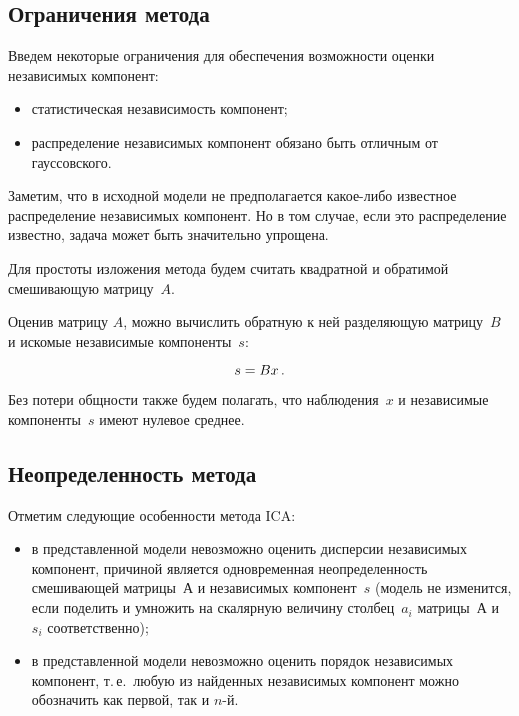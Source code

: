 \begin{multicols}{2}
\subsection{Ограничения метода}

Введем некоторые ограничения для обеспечения возможности оценки
независимых компонент:
\begin{itemize}
\item  статистическая независимость компонент;

\item распределение независимых компонент обязано быть отличным от гауссовского.
\end{itemize}

Заметим, что в исходной модели не предполагается ка\-кое-ли\-бо
известное распределение независимых компонент. Но в том случае, если
это распределение известно, задача может быть значительно упрощена.

Для простоты изложения метода будем считать квадратной и обратимой
смешивающую матрицу~$A$.

Оценив матрицу $A$, можно вычислить обратную к ней разделяющую
мат\-ри\-цу~$B$ и искомые независимые компоненты~$s$:

\noindent
$$
s \hm= B x \,.
$$

Без потери общности также будем полагать, что наблюдения~$x$
и независимые компоненты~$s$ имеют нулевое среднее.

\vspace*{-4pt}

\subsection{Неопределенность метода}

Отметим следующие особенности метода ICA:
\begin{itemize}
\item в представленной модели невозможно оценить дисперсии независимых
компонент, причиной является одновременная неопределенность
смешивающей матрицы~$А$ и независимых компонент~$s$ (модель не
изменится, если поделить и умножить на скалярную величину столбец~$a_{i}$
матрицы~$А$ и $s_{i}$ соответственно);

\item в представленной модели невозможно оценить порядок независимых
компонент, т.\,е.\ любую из найденных независимых компонент можно
обозначить как первой, так и $n$-й.

\end{itemize}


\end{multicols}
